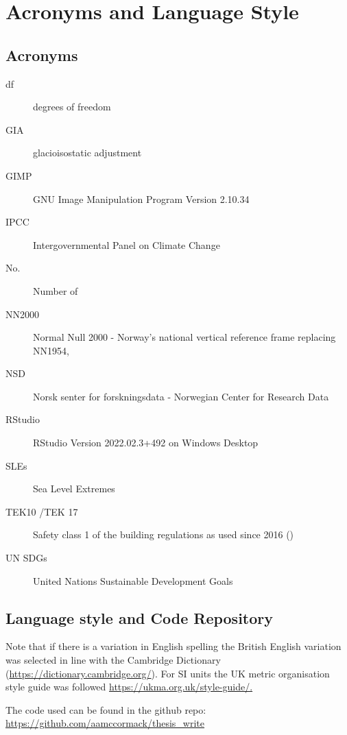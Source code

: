 \chapter{Acronyms and Language Style}

\section{Acronyms}
\begin{description}
\item[df]degrees of freedom
\item[GIA] glacioisostatic adjustment
\item[GIMP] GNU Image Manipulation Program Version 2.10.34
\item[IPCC] Intergovernmental Panel on Climate Change 
\item[No.] Number of
\item[NN2000] Normal Null 2000 - Norway's national vertical reference frame replacing NN1954, 
\item[NSD] Norsk senter for forskningsdata - Norwegian Center for Research Data
\item [RStudio] RStudio Version 2022.02.3+492 on Windows Desktop
\item[SLEs] Sea Level Extremes
\item[TEK10 /TEK 17] Safety class 1 of the building regulations as used since 2016 (\cite{tides_high_2022})
\item [UN SDGs] United Nations Sustainable Development Goals 
\end{description}

\section{Language style and Code Repository}
Note that if there is a variation in English spelling the British English variation was selected in line with the Cambridge Dictionary (\url{https://dictionary.cambridge.org/}). For SI units the UK metric organisation style guide was followed \url{https://ukma.org.uk/style-guide/.}  

The code used can be found in the github repo: 
\url{ https://github.com/aamccormack/thesis_write}